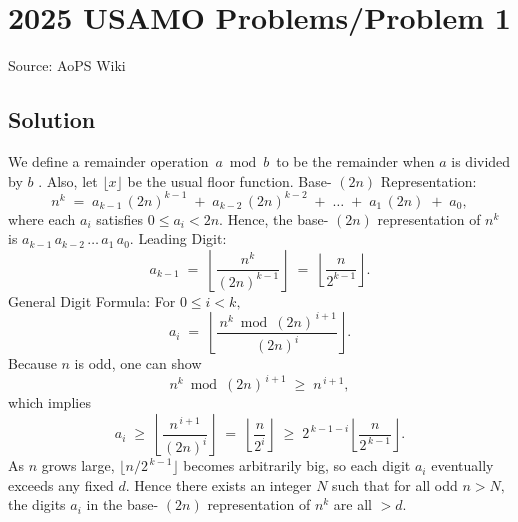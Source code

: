 \documentclass[12pt]{article}
\begin{document}
\section*{{2025 USAMO Problems/Problem 1}}
Source: AoPS Wiki

\subsection*{Solution}
We define a remainder operation $\,a \bmod b\,$ to be the remainder when $a$ is divided by $b$ .
Also, let $\lfloor x\rfloor$ be the usual floor function. Base- $(2n)$ Representation: \[n^k \;=\; a_{k-1}\,(2n)^{k-1} \;+\; a_{k-2}\,(2n)^{k-2} \;+\;\dots\;+\;a_1\,(2n)\;+\;a_0,\] where each $a_i$ satisfies $0 \le a_i < 2n.$ Hence, the base- $(2n)$ representation of $n^k$ is $a_{k-1}\,a_{k-2}\,\dots\,a_1\,a_0.$ Leading Digit: \[a_{k-1} \;=\; \left\lfloor \dfrac{n^k}{(2n)^{k-1}} \right\rfloor \;=\; \left\lfloor \dfrac{n}{2^{k-1}} \right\rfloor.\] General Digit Formula:
For $0 \le i < k,$ \[a_i \;=\; \left\lfloor \dfrac{\,n^k \bmod (2n)^{\,i+1}}{(2n)^i} \right\rfloor.\] Because $n$ is odd, one can show \[n^k \bmod (2n)^{\,i+1} \;\ge\; n^{\,i+1},\] which implies \[a_i \;\ge\; \left\lfloor \dfrac{n^{\,i+1}}{(2n)^i} \right\rfloor \;=\; \left\lfloor \dfrac{n}{2^i} \right\rfloor \;\ge\; 2^{\,k-1-i} \left\lfloor \dfrac{n}{2^{\,k-1}} \right\rfloor.\] As $n$ grows large, $\bigl\lfloor n / 2^{\,k-1}\bigr\rfloor$ becomes arbitrarily big, so each digit $a_i$ eventually exceeds any fixed $d.$ Hence there exists an integer $N$ such that for all odd $n > N,$ the digits $a_i$ in the base- $(2n)$ representation of $n^k$ are all $> d.$
\end{document}
